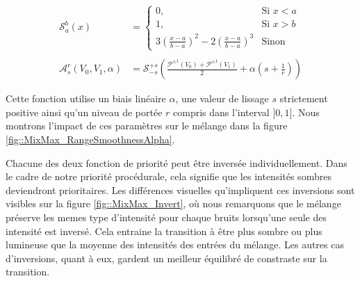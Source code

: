 \documentclass[9pt, twocolumn]{article} %
\begin{document}
\begin{equation}
  \begin{split}
    \mathcal S^b_a(x) &=
    \begin{cases}
      0,                                                                      & \text{Si } x < a \\
      1,                                                                      & \text{Si } x > b \\
      3\left(\frac{x - a}{b - a}\right)^2-2\left(\frac{x - a}{b - a}\right)^3 & \text{Sinon}
    \end{cases}
    \\
    \\
    \mathcal{A}^r_s(V_0, V_1, \alpha)  &= \mathcal S^{+s}_{-s}\left(
    \frac{\mathcal P^{\pm 1}(V_0) +\mathcal P^{\pm 1}(V_1)}{2}+ \alpha\left(s + \frac{1}{r}\right)\right)
  \end{split}
\end{equation}

Cette fonction utilise un biais linéaire $\alpha$, une valeur de lissage $s$
strictement positive ainsi qu'un niveau de portée $r$ compris dans l'interval
$]0, 1]$. Nous montrons l'impact de ces paramètres sur le mélange dans la
figure \ref{fig::MixMax_RangeSmoothnessAlpha}.

Chacune des deux fonction de priorité peut être inversée individuellement. Dans
le cadre de notre priorité procédurale, cela signifie que les intensités
sombres deviendront prioritaires. Les différences visuelles qu'impliquent ces
inversions sont visibles sur la figure \ref{fig::MixMax_Invert}, où nous
remarquons que le mélange préserve les memes type d'intensité pour chaque
bruits lorsqu'une seule des intensité est inversé. Cela entraine la transition
à être plus sombre ou plus lumineuse que la moyenne des intensités des entrées
du mélange. Les autres cas d'inversions, quant à eux, gardent un meilleur
équilibré de constraste sur la transition.
\end{document}

